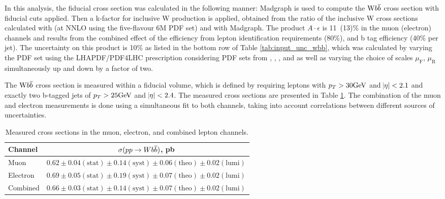 In this analysis, the fiducial cross section was calculated in the following manner:
 Madgraph is used to compute the $\mathrm{W} b\overline{b}$ cross section with fiducial cuts applied.
Then a k-factor for inclusive W production is applied, obtained from the ratio
of the inclusive W cross sections calculated with \FEWZ (at NNLO using the five-flavour
\CTEQ6M PDF set) and with Madgraph.
The product $A\cdot\epsilon$ is 11~(13)\% in the
 muon (electron) channels and results from the
 combined effect of the efficiency from
 lepton identification requirements (80\%), and b tag efficiency (40\% per jet).
The uncertainty on this product is 10\% as listed in the bottom row of
 Table \ref{tab:input_unc_wbb}, which was calculated by varying the PDF
 set using the LHAPDF/PDF4LHC \cite{LHAPDF,Botje:2011sn,Alekhin:2011sk,Ball:2012cx}
 prescription considering
 PDF sets from \CTEQ, \MSTW, \NNPDF, and \HERA
 as well as varying the
 choice of scales
 $\mu_{\mathrm{F}}$, $\mu_{\mathrm{R}}$ simultaneously
 up and down by a factor of two.

The $\mathrm{W} b\overline{b}$ cross section is measured within a fiducial volume, which is defined by
requiring leptons with $p_T > 30\mathrm{GeV}$ and $\abs{\eta}<2.1$ and exactly two b-tagged jets of
 $p_T > 25\mathrm{GeV}$ and $\abs{\eta}<2.4$.
The measured cross sections are presented in Table \ref{tab:crosssections}.
The combination of the muon and electron measurements is done using a simultaneous fit to both channels,
 taking into account correlations between different sources of uncertainties.

\begin{table}[htbp]
\begin{center}
\caption[Measured cross sections for \ppwbblnbb]{
 Measured cross sections in the muon, electron, and combined lepton channels.}
\label{tab:crosssections}
 \begin{tabular}{l|c}
 Channel        & $\sigma(pp\rightarrow Wb\overline{b})$, pb \\

\hline
     Muon & $  0.62 \pm 0.04 \mathrm{(stat)} \pm 0.14 \mathrm{(syst)} \pm 0.06 \mathrm{(theo)} \pm 0.02 \mathrm{(lumi)} $ \\
 Electron & $  0.69 \pm 0.05 \mathrm{(stat)} \pm 0.19 \mathrm{(syst)} \pm 0.07 \mathrm{(theo)} \pm 0.02 \mathrm{(lumi)} $ \\
 Combined & $  0.66 \pm 0.03 \mathrm{(stat)} \pm 0.14 \mathrm{(syst)} \pm 0.07 \mathrm{(theo)} \pm 0.02 \mathrm{(lumi)} $ \\
 \end{tabular}
\end{center}
\end{table}


